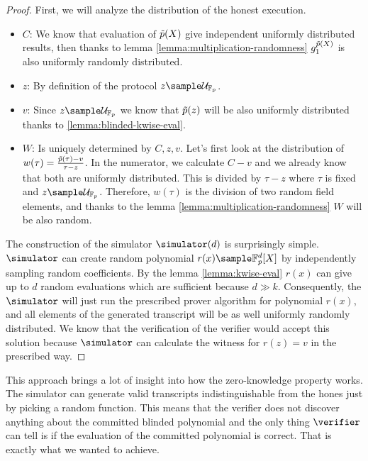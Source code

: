 \begin{proof}
    First, we will analyze the distribution of the honest execution. 
    \begin{itemize}
        \item $C$: We know that evaluation of $\Tilde{p}(X)$ give independent uniformly distributed results, then thanks to lemma \cref{lemma:multiplication-randomness} $g_1^{\Tilde{p}(X)}$ is also uniformly randomly distributed.
        \item $z$: By definition of the protocol $z \sample \mathcal{U}_{\field}$.
        \item $v$: Since $z \sample \mathcal{U}_{\field}$ we know that $\Tilde{p}(z)$ will be also uniformly distributed thanks to \cref{lemma:blinded-kwise-eval}.
        \item $W$: Is uniquely determined by $C, z, v$. Let's first look at the distribution of $w(\tau) = \frac{\Tilde{p}(\tau) - v}{\tau - z}$. In the numerator, we calculate $C - v$ and we already know that both are uniformly distributed. This is divided by $\tau - z$ where $\tau$ is fixed and $z \sample \mathcal{U}_{\field}$. Therefore, $w(\tau)$ is the division of two random field elements, and thanks to the lemma \cref{lemma:multiplication-randomness} $W$ will be also random. 
    \end{itemize}

    The construction of the simulator $\simulator(d)$ is surprisingly simple. $\simulator$ can create random polynomial $r(x) \sample \field^d[X]$ by independently sampling random coefficients. By the lemma \cref{lemma:kwise-eval} $r(x)$ can give up to $d$ random evaluations which are sufficient because $d \gg k$. Consequently, the $\simulator$ will just run the prescribed prover algorithm for polynomial $r(x)$, and all elements of the generated transcript will be as well uniformly randomly distributed. We know that the verification of the verifier would accept this solution because $\simulator$ can calculate the witness for $r(z) = v$ in the prescribed way.
\end{proof}

This approach brings a lot of insight into how the zero-knowledge property works. The simulator can generate valid transcripts indistinguishable from the hones just by picking a random function. This means that the verifier does not discover anything about the committed blinded polynomial and the only thing $\verifier$ can tell is if the evaluation of the committed polynomial is correct. That is exactly what we wanted to achieve.

